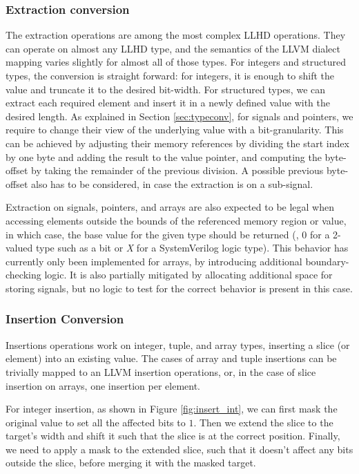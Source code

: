\subsubsection{Extraction conversion}
\label{sec:extrs}
The extraction operations are among the most complex LLHD operations. They can operate on almost any LLHD type, and the semantics of the LLVM dialect mapping varies slightly for almost all of those types. For integers and structured types, the conversion is straight forward: for integers, it is enough to shift the value and truncate it to the desired bit-width.
For structured types, we can extract each required element and insert it in a newly defined value with the desired length. As explained in Section \ref{sec:typeconv}, for signals and pointers, we require to change their view of the underlying value with a bit-granularity. This can be achieved by adjusting their memory references by dividing the start index by one byte and adding the result to the value pointer, and computing the byte-offset by taking the remainder of the previous division. A possible previous byte-offset also has to be considered, in case the extraction is on a sub-signal.

Extraction on signals, pointers, and arrays are also expected to be legal when accessing elements outside the bounds of the referenced memory region or value, in which case, the base value for the given type should be returned (\ie, $0$ for a 2-valued type such as a bit or \textit{X} for a SystemVerilog logic type). This behavior has currently only been implemented for arrays, by introducing additional boundary-checking logic. It is also partially mitigated by allocating additional space for storing signals, but no logic to test for the correct behavior is present in this case.


\subsubsection{Insertion Conversion}
Insertions operations work on integer, tuple, and array types, inserting a slice (or element) into an existing value. The cases of array and tuple insertions can be trivially mapped to an LLVM insertion operations, or, in the case of slice insertion on arrays, one insertion per element.

For integer insertion, as shown in Figure \ref{fig:insert_int}, we can first mask the original value to set all the affected bits to $1$. Then we extend the slice to the target's width and shift it such that the slice is at the correct position. Finally, we need to apply a mask to the extended slice, such that it doesn't affect any bits outside the slice, before merging it with the masked target.

